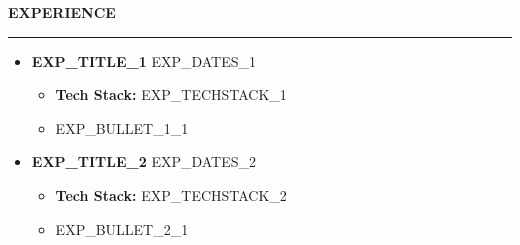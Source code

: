 \documentclass[10pt]{article}
\newcommand{\resheading}[1]{\vspace{6pt} \noindent \textbf{\large\scshape{#1}} \vspace{3pt} \hrule \vspace{4pt}}
\begin{document}
\resheading{EXPERIENCE}
\begin{itemize}
\item \textbf{{{EXP_TITLE_1}}} \hfill {{EXP_DATES_1}}
    \begin{itemize}[noitemsep]
        \item \textbf{Tech Stack:} {{EXP_TECHSTACK_1}}
        \item {{EXP_BULLET_1_1}}
    \end{itemize}
\item \textbf{{{EXP_TITLE_2}}} \hfill {{EXP_DATES_2}}
    \begin{itemize}[noitemsep]
        \item \textbf{Tech Stack:} {{EXP_TECHSTACK_2}}
        \item {{EXP_BULLET_2_1}}
    \end{itemize}
\end{itemize}
\end{document}
